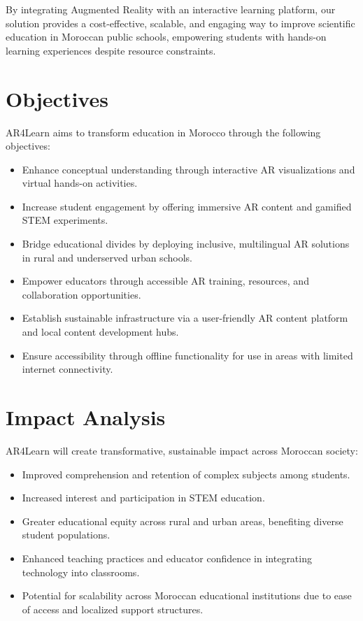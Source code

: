 \documentclass[11pt,                                          %
a4paper,                                       %
twoside]{report}                               %
\begin{document}
By integrating Augmented Reality with an interactive learning platform, our solution provides a cost-effective, scalable, and engaging way to improve scientific education in Moroccan public schools, empowering students with hands-on learning experiences despite resource constraints.

\chapter{Objectives}
AR4Learn aims to transform education in Morocco through the following objectives:
\begin{itemize}
	\item Enhance conceptual understanding through interactive AR visualizations and virtual hands-on activities.
	\item Increase student engagement by offering immersive AR content and gamified STEM experiments.
	\item Bridge educational divides by deploying inclusive, multilingual AR solutions in rural and underserved urban schools.
	\item Empower educators through accessible AR training, resources, and collaboration opportunities.
	\item Establish sustainable infrastructure via a user-friendly AR content platform and local content development hubs.
	\item Ensure accessibility through offline functionality for use in areas with limited internet connectivity.
\end{itemize}

\chapter{Impact Analysis}
AR4Learn will create transformative, sustainable impact across Moroccan society:
\begin{itemize}
	\item Improved comprehension and retention of complex subjects among students.
	\item Increased interest and participation in STEM education.
	\item Greater educational equity across rural and urban areas, benefiting diverse student populations.
	\item Enhanced teaching practices and educator confidence in integrating technology into classrooms.
	\item Potential for scalability across Moroccan educational institutions due to ease of access and localized support structures.
\end{itemize}
\end{document}
